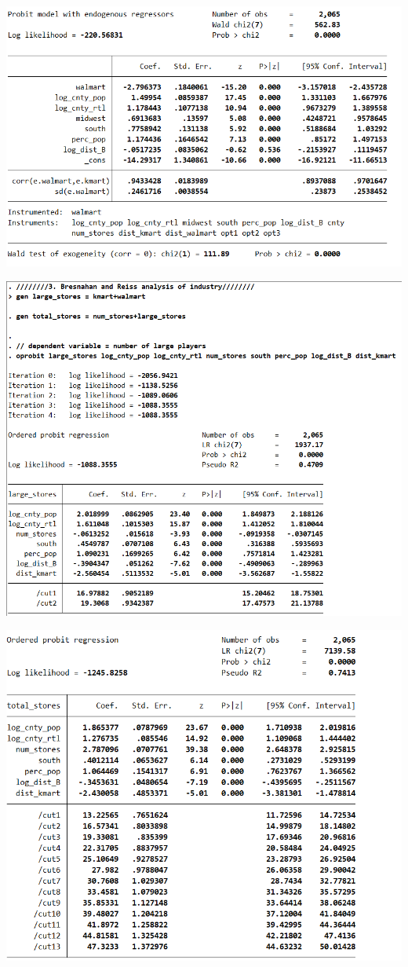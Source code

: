 \documentclass[11pt]{article} %
\begin{document}
\begin{center}
\includegraphics{fig4}

\includegraphics{fig5}

\includegraphics{fig6}


\end{center}
\end{document}
